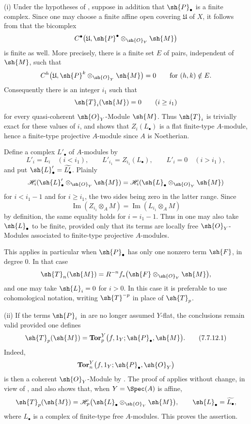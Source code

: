 \begin{remarks}[7.7.12]
\label{III.7.7.12}
\textnormal{(i)}
Under the hypotheses of , suppose in
addition that $\sh{P}_\bullet$ is a finite complex.  Since
one may choose a finite affine open covering $\mathfrak U$
of $X$, it follows from  that the
bicomplex
\[
  C^\bullet
  \bigl(
    \mathfrak U,
    \sh{P}^\bullet\otimes_{\sh{O}_Y}\sh{M}
  \bigr)
\]
is finite as well.  More precisely, there is a finite set
$E$ of pairs, independent of $\sh{M}$, such that
\[
  C^h
  \bigl(
    \mathfrak U,
    \sh{P}^k\otimes_{\sh{O}_Y}\sh{M}
  \bigr)
  =0
  \qquad\text{for }(h,k)\notin E.
\]
Consequently there is an integer $i_1$ such that
\[
  \sh{T}_i(\sh{M})=0
  \qquad(i\geq i_1)
\]
for every quasi-coherent $\sh{O}_Y$-Module $\sh{M}$.  Thus
$\sh{T}_i$ is trivially exact for these values of $i$, and
 shows that $Z_i(L_\bullet)$ is a flat
finite-type $A$-module, hence a finite-type projective
$A$-module since $A$ is Noetherian.

Define a complex $L'_\bullet$ of $A$-modules by
\[
  L'_i=L_i\quad(i<i_1),
  \qquad
  L'_{i_1}=Z_{i_1}(L_\bullet),
  \qquad
  L'_i=0\quad(i>i_1),
\]
and put $\sh{L}'_\bullet=\widetilde{L'_\bullet}$.  Plainly
\[
  \mathscr{H}_i
  (\sh{L}'_\bullet\otimes_{\sh{O}_Y}\sh{M})
  =
  \mathscr{H}_i
  (\sh{L}_\bullet\otimes_{\sh{O}_Y}\sh{M})
\]
for $i<i_1-1$ and for $i\geq i_1$, the two sides being zero
in the latter range.  Since
\[
  \operatorname{Im}
  (Z_{i_1}\otimes_A M)
  =
  \operatorname{Im}
  (L_{i_1}\otimes_A M)
\]
by definition, the same equality holds for $i=i_1-1$.
Thus in  one may also take
$\sh{L}_\bullet$ to be finite, provided only that its terms
are locally free $\sh{O}_Y$-Modules associated to
finite-type projective $A$-modules.

This applies in particular when $\sh{P}_\bullet$ has only
one nonzero term $\sh{F}$, in degree $0$.  In that case
\[
  \sh{T}_n(\sh{M})
  =
  R^{-n}f_*
  \bigl(\sh{F}\otimes_{\sh{O}_Y}\sh{M}\bigr),
\]
and one may take $\sh{L}_i=0$ for $i>0$.  In this case it is
preferable to use cohomological notation, writing
$\sh{T}^{-p}$ in place of $\sh{T}_p$.

\medskip
\textnormal{(ii)}
If the terms $\sh{P}_i$ in  are no longer
assumed $Y$-flat, the conclusions remain valid provided one
defines
\[
  \sh{T}_p(\sh{M})
  =
  \mathbf{Tor}^Y_p
  \bigl(f,1_Y;\sh{P}_\bullet,\sh{M}\bigr).
  \tag{7.7.12.1}\label{III.7.7.12.1}
\]
Indeed,
\[
  \mathbf{Tor}^Y_n
  \bigl(f,1_Y;\sh{P}_\bullet,\sh{O}_Y\bigr)
\]
is then a coherent $\sh{O}_Y$-Module by
.  The proof of  applies
without change, in view of , and also shows
that, when $Y=\Spec(A)$ is affine,
\[
  \sh{T}_p(\sh{M})
  =
  \mathscr{H}_p
  \bigl(
    \sh{L}_\bullet\otimes_{\sh{O}_Y}\sh{M}
  \bigr),
  \qquad
  \sh{L}_\bullet=\widetilde{L_\bullet},
\]
where $L_\bullet$ is a complex of finite-type free
$A$-modules.  This proves the assertion.
\end{remarks}
